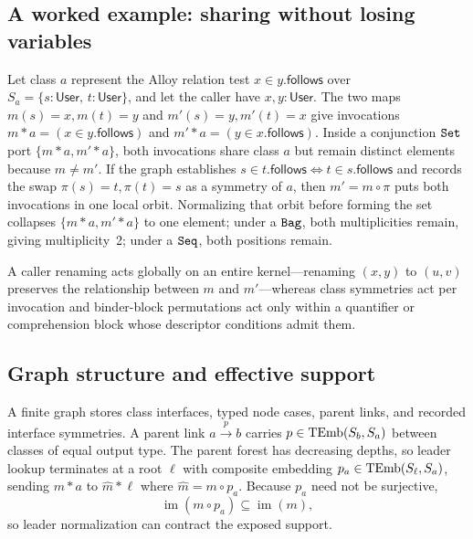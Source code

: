 \subsection{A worked example: sharing without losing variables}
\label{sec:worked-example}

Let class $a$ represent the Alloy relation test $x\in y.\mathsf{follows}$ over
$S_a=\{s:\mathsf{User},\,t:\mathsf{User}\}$, and let the caller have
$x,y:\mathsf{User}$. The two maps
$m(s)=x, m(t)=y$ and $m'(s)=y, m'(t)=x$ give invocations
$m*a=(x\in y.\mathsf{follows})$ and $m'*a=(y\in x.\mathsf{follows})$. Inside
a conjunction $\texttt{Set}$ port $\{m*a,m'*a\}$, both invocations share class $a$ but
remain distinct elements because $m\neq m'$. If the graph establishes
$s\in t.\mathsf{follows}\iff t\in s.\mathsf{follows}$ and records the swap
$\pi(s)=t, \pi(t)=s$ as a symmetry of $a$, then $m'=m\circ\pi$ puts both
invocations in one local orbit. Normalizing that orbit before forming the set
collapses $\{m*a,m'*a\}$ to one element; under a $\texttt{Bag}$, both multiplicities
remain, giving multiplicity~2; under a $\texttt{Seq}$, both positions remain.

A caller renaming acts globally on an entire kernel—renaming $(x,y)$ to
$(u,v)$ preserves the relationship between $m$ and $m'$—whereas class
symmetries act per invocation and binder-block permutations act only within a
quantifier or comprehension block whose descriptor conditions admit them.

\subsection{Graph structure and effective support}

A finite graph stores class interfaces, typed node cases, parent links, and
recorded interface symmetries. A parent link $a\xrightarrow{p}b$ carries
$p\in\operatorname{TEmb}(S_b,S_a)$ between classes of equal output type. The parent forest has
decreasing depths, so leader lookup terminates at a root $\ell$ with composite
embedding $p_a\in\operatorname{TEmb}(S_\ell,S_a)$, sending $m*a$ to $\widehat m*\ell$ where
$\widehat m=m\circ p_a$. Because $p_a$ need not be surjective,
\begin{equation}
 \operatorname{im}(m\circ p_a)\subseteq\operatorname{im}(m),
 \label{eq:find-support}
\end{equation}
so leader normalization can contract the exposed support.

